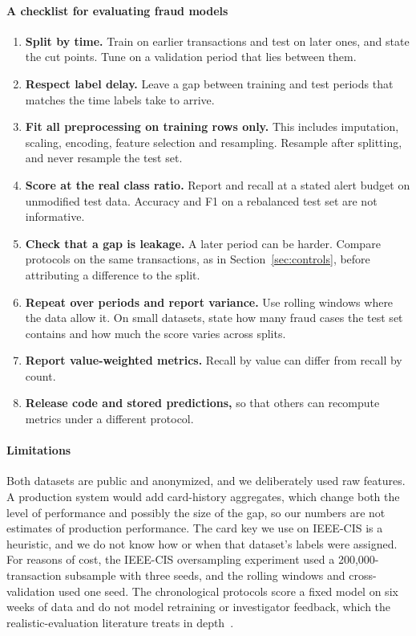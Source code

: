 \paragraph{A checklist for evaluating fraud models}
\begin{enumerate}[leftmargin=1.8em,itemsep=2pt]
\item \textbf{Split by time.} Train on earlier transactions and test on later ones, and state the cut points. Tune on a validation period that lies between them.
\item \textbf{Respect label delay.} Leave a gap between training and test periods that matches the time labels take to arrive.
\item \textbf{Fit all preprocessing on training rows only.} This includes imputation, scaling, encoding, feature selection and resampling. Resample after splitting, and never resample the test set.
\item \textbf{Score at the real class ratio.} Report \prauc{} and recall at a stated alert budget on unmodified test data. Accuracy and F1 on a rebalanced test set are not informative.
\item \textbf{Check that a gap is leakage.} A later period can be harder. Compare protocols on the same transactions, as in Section~\ref{sec:controls}, before attributing a difference to the split.
\item \textbf{Repeat over periods and report variance.} Use rolling windows where the data allow it. On small datasets, state how many fraud cases the test set contains and how much the score varies across splits.
\item \textbf{Report value-weighted metrics.} Recall by value can differ from recall by count.
\item \textbf{Release code and stored predictions,} so that others can recompute metrics under a different protocol.
\end{enumerate}

\paragraph{Limitations}
Both datasets are public and anonymized, and we deliberately used raw features. A production system would add card-history aggregates, which change both the level of performance and possibly the size of the gap, so our numbers are not estimates of production performance. The card key we use on IEEE-CIS is a heuristic, and we do not know how or when that dataset's labels were assigned. For reasons of cost, the IEEE-CIS oversampling experiment used a 200{,}000-transaction subsample with three seeds, and the rolling windows and cross-validation used one seed. The chronological protocols score a fixed model on six weeks of data and do not model retraining or investigator feedback, which the realistic-evaluation literature treats in depth~\cite{dalpozzolo2018credit}.

